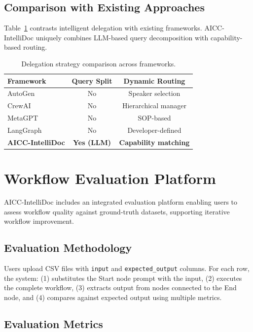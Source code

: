 \documentclass[11pt]{article}
\begin{document}
\subsection{Comparison with Existing Approaches}

Table~\ref{tab:delegation-comparison} contrasts intelligent delegation with existing frameworks. AICC-IntelliDoc uniquely combines LLM-based query decomposition with capability-based routing.

\begin{table}[t]
\centering
\small
\begin{tabular}{lcc}
\toprule
\textbf{Framework} & \textbf{Query Split} & \textbf{Dynamic Routing} \\
\midrule
AutoGen & No & Speaker selection \\
CrewAI & No & Hierarchical manager \\
MetaGPT & No & SOP-based \\
LangGraph & No & Developer-defined \\
\textbf{AICC-IntelliDoc} & \textbf{Yes (LLM)} & \textbf{Capability matching} \\
\bottomrule
\end{tabular}
\caption{Delegation strategy comparison across frameworks.}
\label{tab:delegation-comparison}
\end{table}


\section{Workflow Evaluation Platform}
\label{sec:evaluation}

AICC-IntelliDoc includes an integrated evaluation platform enabling users to assess workflow quality against ground-truth datasets, supporting iterative workflow improvement.

\subsection{Evaluation Methodology}

Users upload CSV files with \texttt{input} and \texttt{expected\_output} columns. For each row, the system: (1) substitutes the Start node prompt with the input, (2) executes the complete workflow, (3) extracts output from nodes connected to the End node, and (4) compares against expected output using multiple metrics.

\subsection{Evaluation Metrics}
\end{document}
